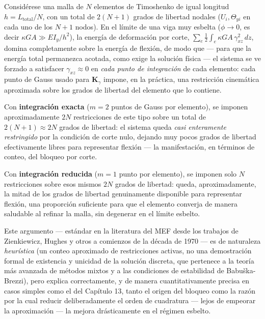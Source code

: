\begin{observacion}
Considérese una malla de $N$ elementos de Timoshenko de igual longitud $h=L_{\text{total}}/N$, con un total de $2(N+1)$ grados de libertad nodales ($U_i,\Theta_{yi}$ en cada uno de los $N+1$ nodos). En el límite de una viga muy esbelta ($\phi\to0$, es decir $\kappa GA\gg EI_y/h^2$), la energía de deformación por corte, $\sum_e \tfrac12\int_e\kappa GA\,\gamma_{xz}^2\,dz$, domina completamente sobre la energía de flexión, de modo que --- para que la energía total permanezca acotada, como exige la solución física --- el sistema se ve forzado a satisfacer $\gamma_{xz}\approx0$ en \emph{cada punto de integración} de cada elemento: cada punto de Gauss usado para $\bm K_\gamma$ impone, en la práctica, una restricción cinemática aproximada sobre los grados de libertad del elemento que lo contiene.

Con \textbf{integración exacta} ($m=2$ puntos de Gauss por elemento), se imponen aproximadamente $2N$ restricciones de este tipo sobre un total de $2(N+1)\approx2N$ grados de libertad: el sistema queda \emph{casi enteramente restringido} por la condición de corte nulo, dejando muy pocos grados de libertad efectivamente libres para representar flexión --- la manifestación, en términos de conteo, del bloqueo por corte.

Con \textbf{integración reducida} ($m=1$ punto por elemento), se imponen solo $N$ restricciones sobre esos mismos $2N$ grados de libertad: queda, aproximadamente, la mitad de los grados de libertad genuinamente disponible para representar flexión, una proporción suficiente para que el elemento converja de manera saludable al refinar la malla, sin degenerar en el límite esbelto.
\end{observacion}

Este argumento --- estándar en la literatura del MEF desde los trabajos de Zienkiewicz, Hughes y otros a comienzos de la década de 1970 --- es de naturaleza \emph{heurística} (un conteo aproximado de restricciones activas, no una demostración formal de existencia y unicidad de la solución discreta, que pertenece a la teoría más avanzada de métodos mixtos y a las condiciones de estabilidad de Babuška-Brezzi), pero explica correctamente, y de manera cuantitativamente precisa en casos simples como el del Capítulo 13, tanto el origen del bloqueo como la razón por la cual reducir deliberadamente el orden de cuadratura --- lejos de empeorar la aproximación --- la mejora drásticamente en el régimen esbelto.

